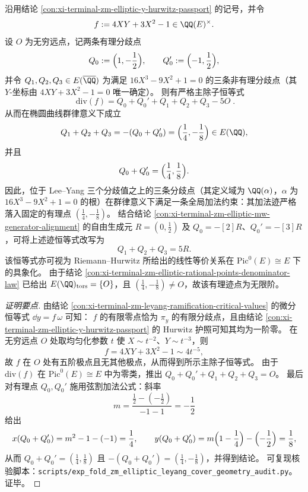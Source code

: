 

\begin{conclusion}\label{con:xi-terminal-zm-leyang-ramification-divisor-principalization-trace}
沿用结论 \ref{con:xi-terminal-zm-elliptic-y-hurwitz-passport} 的记号，并令
\[
f:=4XY+3X^2-1\in\QQ(E)^\times.
\]
设 \(O\) 为无穷远点，记两条有理分歧点
\[
Q_0:=\Bigl(1,-\frac12\Bigr),\qquad Q_0':=\Bigl(-1,\frac12\Bigr),
\]
并令 \(Q_1,Q_2,Q_3\in E(\overline{\QQ})\) 为满足 \(16X^3-9X^2+1=0\) 的三条非有理分歧点（其 \(Y\)-坐标由 \(4XY+3X^2-1=0\) 唯一确定）。
则有严格主除子恒等式
\[
\boxed{\;
\mathrm{div}(f)=Q_0+Q_0'+Q_1+Q_2+Q_3-5O\; }.
\]
从而在椭圆曲线群律意义下成立
\[
Q_1+Q_2+Q_3=-(Q_0+Q_0')=\Bigl(\frac14,-\frac18\Bigr)\in E(\QQ),
\]
并且
\[
Q_0+Q_0'=\Bigl(\frac14,\frac18\Bigr).
\]
因此，位于 Lee--Yang 三个分歧值之上的三条分歧点（其定义域为 \(\QQ(\alpha)\)，\(\alpha\) 为 \(16X^3-9X^2+1=0\) 的根）在群律意义下满足一条全局加法约束：其加法迹严格落入固定的有理点 \((\tfrac14,-\tfrac18)\)。
结合结论 \ref{con:xi-terminal-zm-elliptic-mw-generator-alignment} 的自由生成元 \(R=(0,\tfrac12)\) 及 \(Q_0=-[2]R\)、\(Q_0'=-[3]R\)，可将上述迹恒等式改写为
\[
Q_1+Q_2+Q_3=5R.
\]
该恒等式亦可视为 Riemann--Hurwitz 所给出的线性等价关系在 \(\mathrm{Pic}^0(E)\cong E\) 下的具象化。
由于结论 \ref{con:xi-terminal-zm-elliptic-rational-points-denominator-law} 已给出 \(E(\QQ)_{\mathrm{tors}}=\{O\}\)，且 \((\tfrac14,-\tfrac18)\neq O\)，故该有理迹点为无限阶。
\end{conclusion}
\begin{proof}[证明要点]
由结论 \ref{con:xi-terminal-zm-leyang-ramification-critical-values} 的微分恒等式 \(\dd y=f\,\omega\) 可知：
\(f\) 的有限零点恰为 \(\pi_y\) 的有限分歧点，且由结论 \ref{con:xi-terminal-zm-elliptic-y-hurwitz-passport} 的 Hurwitz 护照可知其均为一阶零。
在无穷远点 \(O\) 处取均匀化参数 \(t\) 使 \(X\sim t^{-2}\)、\(Y\sim t^{-3}\)，则
\[
f=4XY+3X^2-1\sim 4t^{-5},
\]
故 \(f\) 在 \(O\) 处有五阶极点且无其他极点，从而得到所示主除子恒等式。
由于 \(\mathrm{div}(f)\) 在 \(\mathrm{Pic}^{0}(E)\cong E\) 中为零类，推出 \(Q_0+Q_0'+Q_1+Q_2+Q_3=O\)。
最后对有理点 \(Q_0,Q_0'\) 施用弦割加法公式：斜率
\[
m=\frac{\frac12-(-\frac12)}{-1-1}=-\frac12
\]
给出
\[
x(Q_0+Q_0')=m^2-1-(-1)=\frac14,\qquad
y(Q_0+Q_0')=m\Bigl(1-\frac14\Bigr)-\Bigl(-\frac12\Bigr)=\frac18,
\]
从而 \(Q_0+Q_0'=(\tfrac14,\tfrac18)\) 且 \(-(Q_0+Q_0')=(\tfrac14,-\tfrac18)\)，并得到结论。
可复现核验脚本：\texttt{scripts/exp\_fold\_zm\_elliptic\_leyang\_cover\_geometry\_audit.py}。证毕。
\end{proof}

